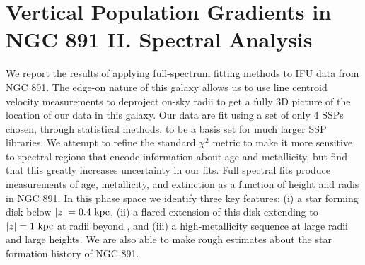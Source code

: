 
\chapter[NGC 891: Full Spectrum Analysis]{Vertical Population Gradients in NGC 891 II. Spectral Analysis}
\label{chap:891_2}

\cleardoublepage

\begin{chabstract}

  We report the results of applying full-spectrum fitting methods to
  IFU data from NGC 891. The edge-on nature of this galaxy allows us
  to use line centroid velocity measurements to deproject on-sky radii
  to get a fully 3D picture of the location of our data in this
  galaxy. Our data are fit using a set of only 4 SSPs chosen, through
  statistical methods, to be a basis set for much larger SSP
  libraries. We attempt to refine the standard $\chi^2$ metric to make
  it more sensitive to spectral regions that encode information about
  age and metallicity, but find that this greatly increases
  uncertainty in our fits. Full spectral fits produce measurements of
  age, metallicity, and extinction as a function of height and radis
  in NGC 891. In this phase space we identify three key features: (i)
  a star forming disk below $|z| = 0.4~\mathrm{kpc} $, (ii) a flared
  extension of this disk extending to $|z| = 1~\mathrm{kpc} $ at radii
  beyond , and (iii) a high-metallicity sequence at large
  radii and large heights. We are also able to make rough estimates
  about the star formation history of NGC 891.



\end{chabstract}

